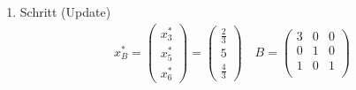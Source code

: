 \documentclass[a4paper]{scrartcl}
\begin{document}
\begin{enumerate}[label=\bfseries\arabic*.]
\begin{enumerate}
\begin{enumerate}[1.]
\begin{enumerate}[1.]
                            \item Schritt (Update)
                                \begin{gather}
                                    x_B^* =
                                    \begin{pmatrix}
                                         x_3^* \\ x_5^* \\ x_6^*
                                    \end{pmatrix}
                                    =
                                    \begin{pmatrix}
                                        \frac{2}{3} \\ 5 \\ \frac{4}{3}
                                    \end{pmatrix}
                                    \quad
                                    B =
                                    \begin{pmatrix}
                                        3 & 0 & 0 \\
                                        0 & 1 & 0 \\
                                        1 & 0 & 1 \\
                                    \end{pmatrix}
                                \end{gather}

                        \end{enumerate}


\end{enumerate}
\end{enumerate}
\end{enumerate}
\end{document}

